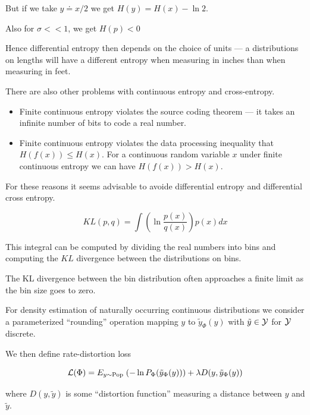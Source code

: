 {\vfill
But if we take $y \doteq x/2$ we get $H(y) = H(x) - \ln 2$.

\vfill
Also for $\sigma << 1$, we get $H(p) < 0$

\vfill
Hence differential entropy then depends on the choice of units --- a distributions on lengths will have a different entropy
when measuring in inches than when measuring in feet.


There are also other problems with continuous entropy and cross-entropy.

\vfill
\begin{itemize}
\item Finite continuous entropy violates the source coding theorem --- it takes an infinite number of bits to code a real number.

\vfill
\item Finite continuous entropy violates the data processing inequality that $H(f(x)) \leq H(x)$.  For a continuous random variable $x$ under finite continuous entropy we can have $H(f(x)) > H(x)$.
\end{itemize}

\vfill
For these reasons it seems advisable to avoide differential entropy and differential cross entropy.


$$KL(p,q) = \int \left( \ln \frac{p(x)}{q(x)}\right) p(x) dx$$

\vfill
This integral can be computed by dividing the real numbers into bins and computing the $KL$ divergence between the distributions on bins.

\vfill
The KL divergence between the bin distribution often approaches a finite limit as the bin size goes to zero.

For density estimation of naturally occurring continuous distributions we consider
a parameterized ``rounding'' operation mapping $y$ to $\tilde{y}_\Phi(y)$ with $\tilde{y} \in {\cal Y}$ for ${\cal Y}$ discrete.

\vfill
We then define rate-distortion loss

\vfill
$${\cal L}(\Phi) = E_{y \sim \mathrm{Pop}}\;(- \ln P_\Phi(\tilde{y}_\Phi(y))) + \lambda D(y,\tilde{y}_\Phi(y))$$

\vfill
where $D(y,\tilde{y})$ is some ``distortion function'' measuring a distance between $y$ and $\tilde{y}$.

}
